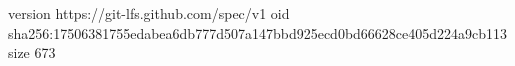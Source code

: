 version https://git-lfs.github.com/spec/v1
oid sha256:17506381755edabea6db777d507a147bbd925ecd0bd66628ce405d224a9cb113
size 673
